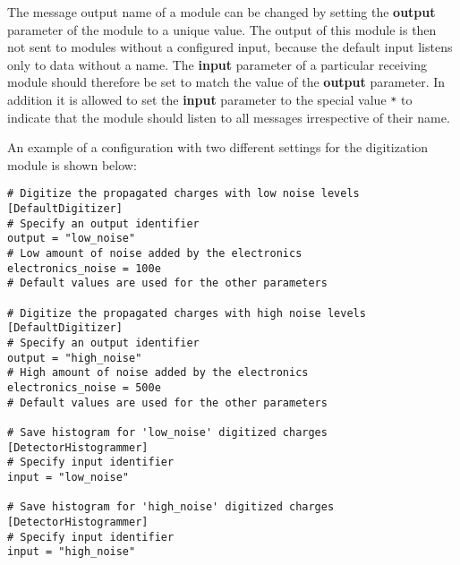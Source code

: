 The message output name of a module can be changed by setting the \textbf{output} parameter of the module to a unique value.
The output of this module is then not sent to modules without a configured input, because the default input listens only to data without a name.
The \textbf{input} parameter of a particular receiving module should therefore be set to match the value of the \textbf{output} parameter.
In addition it is allowed to set the \textbf{input} parameter to the special value \texttt{*} to indicate that the module should listen to all messages irrespective of their name.

An example of a configuration with two different settings for the digitization module is shown below:
\begin{verbatim}
# Digitize the propagated charges with low noise levels
[DefaultDigitizer]
# Specify an output identifier
output = "low_noise"
# Low amount of noise added by the electronics
electronics_noise = 100e
# Default values are used for the other parameters

# Digitize the propagated charges with high noise levels
[DefaultDigitizer]
# Specify an output identifier
output = "high_noise"
# High amount of noise added by the electronics
electronics_noise = 500e
# Default values are used for the other parameters

# Save histogram for 'low_noise' digitized charges
[DetectorHistogrammer]
# Specify input identifier
input = "low_noise"

# Save histogram for 'high_noise' digitized charges
[DetectorHistogrammer]
# Specify input identifier
input = "high_noise"
\end{verbatim}


